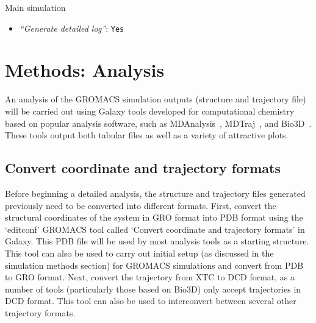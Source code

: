 \documentclass[twocolumn]{bmcart}%
\providecommand{\tightlist}{%
  \setlength{\itemsep}{0pt}\setlength{\parskip}{0pt}}
\begin{document}
\begin{handson_box_colour}{Main simulation}
\begin{itemize}
\begin{itemize}
      \begin{itemize}
      \tightlist
      \item
        \emph{``Temperature /K''}: \texttt{300}
      \item
        \emph{``Step length in ps''}: \texttt{0.001}
      \item
        \emph{``Number of steps that elapse between saving data points
        (velocities, forces, energies)''}: \texttt{1000}
      \item
        \emph{``Number of steps for the simulation''}: \texttt{1000000}
      \end{itemize}
    \end{itemize}
  \item
    \emph{``Generate detailed log''}: \texttt{Yes}
  \end{itemize}

\end{handson_box_colour}


\hypertarget{analysis}{%
\section*{Methods: Analysis}\label{analysis}}

An analysis of the GROMACS simulation outputs (structure and trajectory file) will be carried out using Galaxy tools developed for computational chemistry~\cite{senapathi_biomolecular_2019} based on popular analysis software, such as MDAnalysis~\cite{michaudagrawal_mdanalysis_2011}, MDTraj~\cite{mcgibbon_mdtraj_2015}, and  Bio3D~\cite{skjaerven_integrating_2014}. These tools output both tabular files as well as a variety of attractive plots.



\hypertarget{create-pdb-file-needed-by-most-analysis-tools}{%
\subsection*{Convert coordinate and trajectory formats}\label{create-pdb-file-needed-by-most-analysis-tools}}

Before beginning a detailed analysis, the structure and trajectory files generated previously need to be converted into different formats. First, convert the structural coordinates of the system in GRO format into PDB format using the ‘editconf’ GROMACS tool called ‘Convert coordinate and trajectory formats’ in Galaxy. This PDB file will be used by most analysis tools as a starting structure. This tool can also be used to carry out initial setup (as discussed in the simulation methods section) for GROMACS simulations and convert from PDB to GRO format. Next, convert the trajectory from XTC to DCD format, as a number of tools (particularly those based on Bio3D) only accept trajectories in DCD format. This tool can also be used to interconvert between several other trajectory formats.
\end{document}
